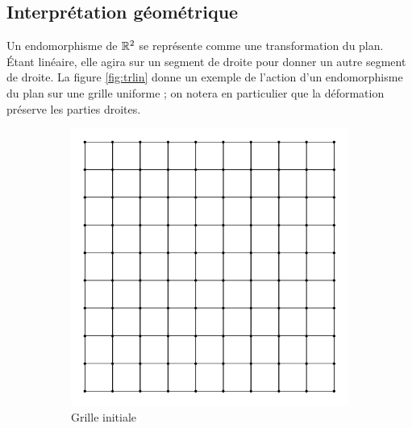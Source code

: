 \subsection{Interprétation géométrique}

Un endomorphisme de $\mathbb{R}^2$ se représente comme une transformation du plan. Étant linéaire, elle agira sur un segment de droite pour donner un autre segment de droite. La figure \ref{fig:trlin} donne un exemple de l'action d'un endomorphisme du plan sur une grille uniforme ; on notera en particulier que la déformation préserve les parties droites.
\begin{figure}[ht]
\centering
\begin{subfigure}[b]{0.45\textwidth}
\includegraphics[width=\textwidth]{images/ima1.png}
\caption{Grille initiale}
\label{fig:uni_mesh}
\end{subfigure}
\begin{subfigure}[b]{0.45\textwidth}

\end{subfigure}
\end{figure}
